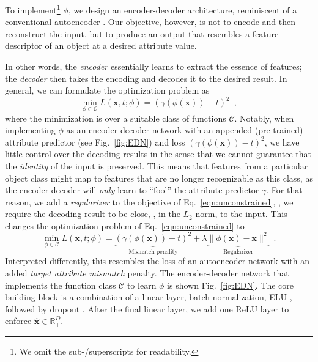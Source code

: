 \documentclass[10pt,twocolumn,letterpaper]{article}
\begin{document}
To implement\footnote{We omit the sub-/superscripts for readability.} $\phi$, we design an encoder-decoder
architecture, reminiscent of a conventional autoencoder \cite{Bengio09a}.
Our objective, however, is not to encode and then reconstruct 
the input, but to produce an output that 
resembles a feature descriptor of an object at a 
desired attribute value.

In other words, the \emph{encoder} essentially learns to extract
the essence of features; the \emph{decoder}
then takes the encoding and decodes it to the desired result. In
general, we can formulate the optimization problem as
\begin{equation}
\min_{\phi \in \mathcal{C}} L(\mathbf{x},t; \phi) = (\gamma(\phi(\mathbf{x}))-t)^2\enspace,
\label{eqn:unconstrained}
\end{equation}
where the minimization is 
over a suitable class of functions $\mathcal{C}$. Notably, when 
implementing $\phi$ as an encoder-decoder network with an 
appended (pre-trained) attribute predictor (see Fig.~\ref{fig:EDN})
and loss $(\gamma(\phi(\mathbf{x}))-t)^2$, we have little control 
over the decoding results in the sense that we cannot guarantee 
that the \emph{identity} of the input is preserved. This means
that features from a particular object class might map to 
features that are no longer recognizable as
this class, as the encoder-decoder will \emph{only} learn to ``fool'' the 
attribute predictor $\gamma$.
For that reason, we add a \emph{regularizer} to the objective
of Eq.~\eqref{eqn:unconstrained}, \ie, we require the 
decoding result to be close, \eg, in the $L_2$ norm, to the
input. This changes the optimization problem of Eq.~\eqref{eqn:unconstrained} to
\begin{equation}
\min_{\phi \in \mathcal{C}} L(\mathbf{x},t; \phi) = \underbrace{(\gamma(\phi(\mathbf{x}))-t)^2}_\text{Mismatch penality} + 
\lambda \underbrace{\| \phi(\mathbf{x}) - \mathbf{x} \|^2}_{\text{Regularizer}}
\enspace.
\label{eqn:constrained}
\end{equation}
Interpreted differently, this resembles the loss of an autoencoder 
network with an added \emph{target attribute mismatch} penalty. 
The encoder-decoder network that implements the function class $\mathcal{C}$ 
to learn $\phi$ is shown Fig.~\ref{fig:EDN}. 
The core building block is a combination of a linear layer, 
batch normalization, ELU \cite{Clevert16a}, followed by dropout 
\cite{Srivastava14a}. After the final linear
layer, we add one ReLU layer to enforce $\hat{\mathbf{x}} \in \mathbb{R}^D_+$.
\end{document}

